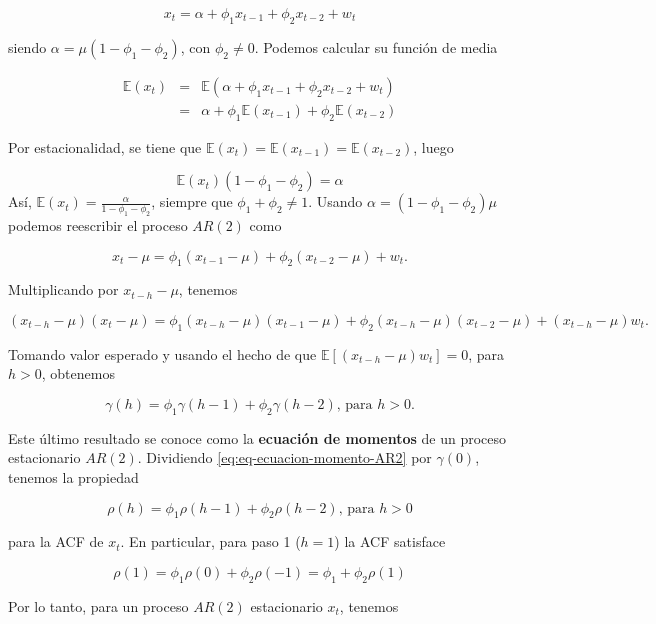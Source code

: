 \documentclass[12pt,]{krantz}
\theoremstyle{definition}
\theoremstyle{definition}
\theoremstyle{definition}
\theoremstyle{remark}
\begin{document}
\begin{equation}
x_t = \alpha + \phi_1 x_{t-1} + \phi_2 x_{t-2} + w_t
\label{eq:eq-AR2}
\end{equation}

siendo \(\alpha = \mu(1-\phi_1-\phi_2)\), con \(\phi_2\neq 0\). Podemos
calcular su función de media

\begin{eqnarray*}
\mathbb{E}(x_t) &=& \mathbb{E}(\alpha + \phi_1 x_{t-1} + \phi_2 x_{t-2} + w_t) \\
    &=& \alpha+\phi_1\mathbb{E}(x_{t-1})+\phi_2\mathbb{E}(x_{t-2})
\end{eqnarray*}

Por estacionalidad, se tiene que
\(\mathbb{E}(x_t)=\mathbb{E}(x_{t-1})=\mathbb{E}(x_{t-2})\), luego

\[\mathbb{E}(x_t)(1-\phi_1-\phi_2) = \alpha\] Así,
\(\mathbb{E}(x_t) = \frac{\alpha}{1-\phi_1-\phi_2}\), siempre que
\(\phi_1+\phi_2\neq1\). Usando \(\alpha=(1-\phi_1-\phi_2)\mu\) podemos
reescribir el proceso \(AR(2)\) como

\[x_t-\mu = \phi_1(x_{t-1}-\mu)+\phi_2(x_{t-2}-\mu)+w_t.\]

Multiplicando por \(x_{t-h}-\mu\), tenemos

\[(x_{t-h}-\mu)(x_t-\mu) = \phi_1(x_{t-h}-\mu)(x_{t-1}-\mu) + \phi_2(x_{t-h}-\mu)(x_{t-2}-\mu) + (x_{t-h}-\mu)w_t.\]

Tomando valor esperado y usando el hecho de que
\(\mathbb{E}[(x_{t-h}-\mu)w_t]=0\), para \(h>0\), obtenemos

\begin{equation}
\gamma(h) = \phi_1\gamma(h-1)+\phi_2\gamma(h-2) \text{, para }h>0.
\label{eq:eq-ecuacion-momento-AR2}
\end{equation}

Este último resultado se conoce como la \textbf{ecuación de momentos} de
un proceso estacionario \(AR(2)\). Dividiendo
\eqref{eq:eq-ecuacion-momento-AR2} por \(\gamma(0)\), tenemos la propiedad

\begin{equation}
\rho(h) = \phi_1\rho(h-1)+\phi_2\rho(h-2)\text{, para }h>0
\label{eq:eq-ACF-AR2-recursiva}
\end{equation}

para la ACF de \(x_t\). En particular, para paso 1 (\(h=1\)) la ACF
satisface

\[\rho(1) = \phi_1\rho(0)+\phi_2\rho(-1) = \phi_1+\phi_2\rho(1)\]

Por lo tanto, para un proceso \(AR(2)\) estacionario \(x_t\), tenemos
\end{document}

